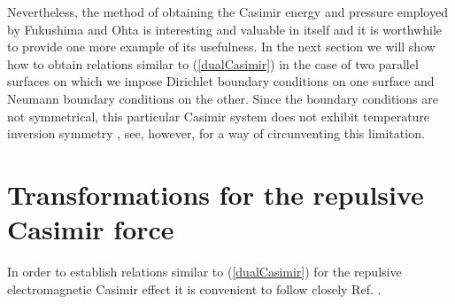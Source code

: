 \documentclass[a4paper,12pt]{article}
\begin{document}
Nevertheless, the method of obtaining the Casimir energy and pressure employed by Fukushima and Ohta is interesting and valuable in itself and it is worthwhile to provide one more example of its usefulness. In the next section we will show how to obtain relations similar to (\ref{dualCasimir}) in the case of two parallel surfaces on which we impose  Dirichlet boundary conditions on one surface and Neumann boundary conditions on the other. Since the boundary conditions are not symmetrical, this particular Casimir system does not exhibit temperature inversion symmetry \cite{Ravndal&Tollefsen89}, see, however, \cite{Santos&Tort1999} for a way of circunventing this limitation. 
%
\section{Transformations for the repulsive Casimir force}
%
In order to establish relations similar to (\ref{dualCasimir}) for the repulsive electromagnetic Casimir effect it is convenient to follow closely Ref. \cite{Fukushima&Ohta2001}.
\end{document}
